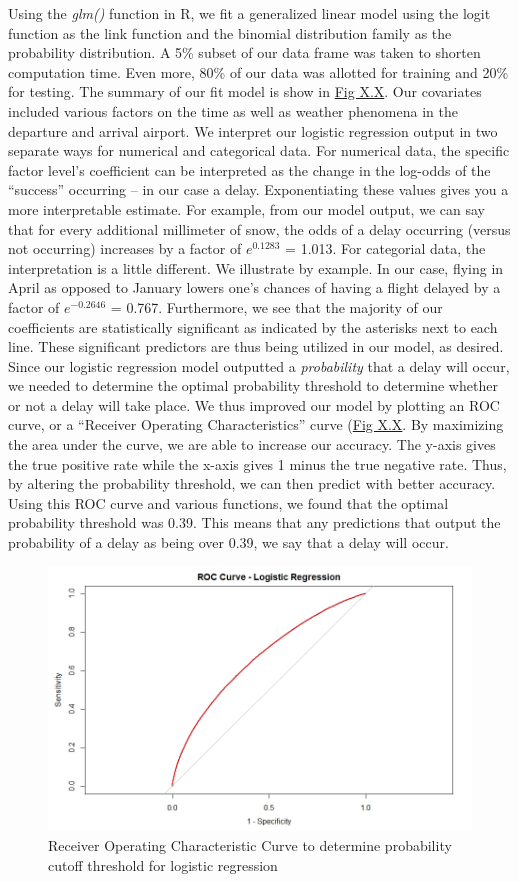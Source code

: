 \documentclass[12pt, a4paper, openany]{book}
\newcommand\tab[1][1cm]{\hspace*{#1}}
\begin{document}
	\tab Using the \textit{glm()} function in R, we fit a generalized linear model using the logit function as the link function and the binomial distribution family as the probability distribution. A 5\% subset of our data frame was taken to shorten computation time. Even more, 80\% of our data was allotted for training and 20\% for testing. The summary of our fit model is show in \underline{Fig X.X}. Our covariates included various factors on the time as well as weather phenomena in the departure and arrival airport. We interpret our logistic regression output in two separate ways for numerical and categorical data. For numerical data, the specific factor level’s coefficient can be interpreted as the change in the log-odds of the “success” occurring – in our case a delay. Exponentiating these values gives you a more interpretable estimate. For example, from our model output, we can say that for every additional millimeter of snow, the odds of a delay occurring (versus not occurring) increases by a factor of $e^{0.1283}$ = 1.013. For categorial data, the interpretation is a little different. We illustrate by example. In our case, flying in April as opposed to January lowers one’s chances of having a flight delayed by a factor of $e^{-0.2646}$ = 0.767. Furthermore, we see that the majority of our coefficients are statistically significant as indicated by the asterisks next to each line. These significant predictors are thus being utilized in our model, as desired. \\
	\tab Since our logistic regression model outputted a \textit{probability} that a delay will occur, we needed to determine the optimal probability threshold to determine whether or not a delay will take place. We thus improved our model by plotting an ROC curve, or a “Receiver Operating Characteristics” curve (\underline{Fig X.X}. By maximizing the area under the curve, we are able to increase our accuracy. The y-axis gives the true positive rate while the x-axis gives 1 minus the true negative rate. Thus, by altering the probability threshold, we can then predict with better accuracy. Using this ROC curve and various functions, we found that the optimal probability threshold was 0.39. This means that any predictions that output the probability of a delay as being over 0.39, we say that a delay will occur. \\
			\begin{figure}
			\centering
	 		\includegraphics[width = .55 \textwidth]{../figures/PLOTS FOR REPORT/Logistic Regression/ROC Curve - Logistic Regression}
	 		\caption{Receiver Operating Characteristic Curve to determine probability cutoff threshold for logistic regression}
	 		\end{figure}
\end{document}
